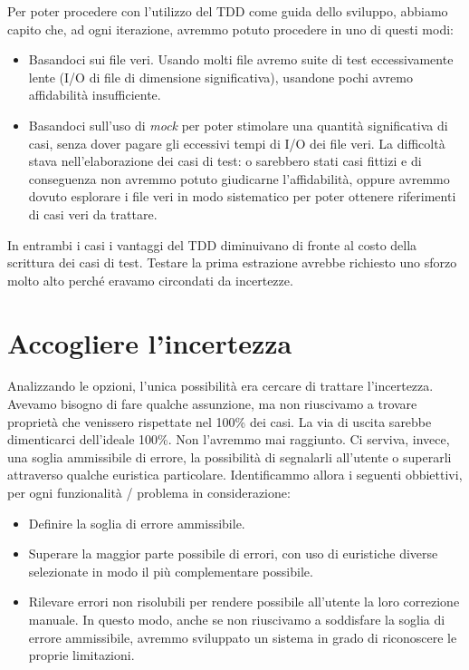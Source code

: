 \documentclass[12pt]{report}
\begin{document}
Per poter procedere con l'utilizzo del TDD come guida dello sviluppo,
abbiamo capito che, ad ogni iterazione, avremmo potuto
procedere in uno di questi modi:

\begin{itemize}
  \item Basandoci sui file veri. Usando molti file avremo suite di test
  eccessivamente lente (I/O di file di dimensione significativa),
  usandone pochi avremo affidabilità insufficiente. 
  \item Basandoci sull'uso di \textit{mock} 
  per poter stimolare una quantità significativa di casi, 
  senza dover pagare gli eccessivi tempi di I/O dei file veri. 
  La difficoltà stava nell'elaborazione dei casi di test: o 
  sarebbero stati casi fittizi e di conseguenza non avremmo potuto giudicarne 
  l'affidabilità, oppure avremmo dovuto esplorare i file veri in modo
  sistematico per poter ottenere riferimenti di casi veri da trattare.
\end{itemize}

In entrambi i casi i vantaggi del TDD diminuivano di fronte al costo della
scrittura dei casi di test. Testare la prima estrazione
avrebbe richiesto uno sforzo molto alto perché eravamo
circondati da incertezze.

\section{Accogliere l'incertezza}

Analizzando le opzioni, l'unica possibilità era cercare di
trattare l'incertezza. Avevamo bisogno di fare qualche assunzione, ma
non riuscivamo a trovare proprietà che venissero rispettate nel 100\%
dei casi. La via di uscita sarebbe dimenticarci dell'ideale 100\%.
Non l'avremmo mai raggiunto. Ci serviva, invece, una soglia ammissibile di
errore, la possibilità di segnalarli all'utente o superarli attraverso qualche
euristica particolare. Identificammo allora i seguenti obbiettivi, per ogni
funzionalità / problema in considerazione: 

\begin{itemize}
  \item Definire la soglia di errore ammissibile.
  \item Superare la maggior parte possibile di errori, con uso di
euristiche diverse selezionate in modo il più complementare possibile.
  \item Rilevare errori non risolubili per rendere possibile
all'utente la loro correzione manuale. In questo modo, anche se non
riuscivamo a soddisfare la soglia di errore ammissibile, avremmo
sviluppato un sistema in grado di riconoscere le proprie limitazioni.
\end{itemize}
\end{document}

